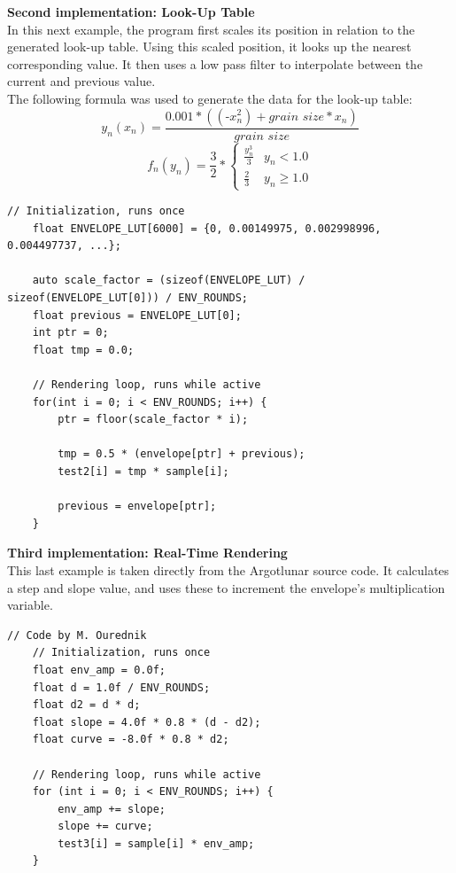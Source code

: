 \documentclass[10pt, twocolumn]{IEEEtran}
\begin{document}
\textbf{Second implementation: Look-Up Table}\\
In this next example, the program first scales its position in relation to the generated look-up table. Using this scaled position, it looks up the nearest corresponding value. It then uses a low pass filter to interpolate between the current and previous value.\\
The following formula was used to generate the data for the look-up table:
\[
y_n(x_n) = \frac{0.001*((\text{-}x_n^2)+\textit{grain size}*x_n)}{\textit{grain size}}
\]
\[	
f_n(y_n) = \frac{3}{2} * \begin{cases}
	\frac{y_n^3}{3}  	& y_n < 1.0 \\
	\frac{2}{3} 	& y_n \geq 1.0
\end{cases}
\]
\begin{minipage}{\linewidth}
\begin{lstlisting}[caption={Envelope application using a look-up table}]
	// Initialization, runs once
	float ENVELOPE_LUT[6000] = {0, 0.00149975, 0.002998996, 0.004497737, ...};
	
	auto scale_factor = (sizeof(ENVELOPE_LUT) / sizeof(ENVELOPE_LUT[0])) / ENV_ROUNDS;
	float previous = ENVELOPE_LUT[0];
	int ptr = 0;
	float tmp = 0.0;
	
	// Rendering loop, runs while active
	for(int i = 0; i < ENV_ROUNDS; i++) {
		ptr = floor(scale_factor * i);
		
		tmp = 0.5 * (envelope[ptr] + previous);
		test2[i] = tmp * sample[i];
		
		previous = envelope[ptr];
	}
\end{lstlisting}
\end{minipage}

\textbf{Third implementation: Real-Time Rendering}\\
This last example is taken directly from the Argotlunar source code. It calculates a step and slope value, and uses these to increment the envelope's multiplication variable.\\
\begin{minipage}{\linewidth}
\begin{lstlisting}[caption={Envelope application using real-time rendering}]
	// Code by M. Ourednik
	// Initialization, runs once
	float env_amp = 0.0f;
	float d = 1.0f / ENV_ROUNDS;
	float d2 = d * d;
	float slope = 4.0f * 0.8 * (d - d2);
	float curve = -8.0f * 0.8 * d2;
	
	// Rendering loop, runs while active
	for (int i = 0; i < ENV_ROUNDS; i++) {
		env_amp += slope;
		slope += curve;
		test3[i] = sample[i] * env_amp;
	}
\end{lstlisting}
\end{minipage}
\end{document}
